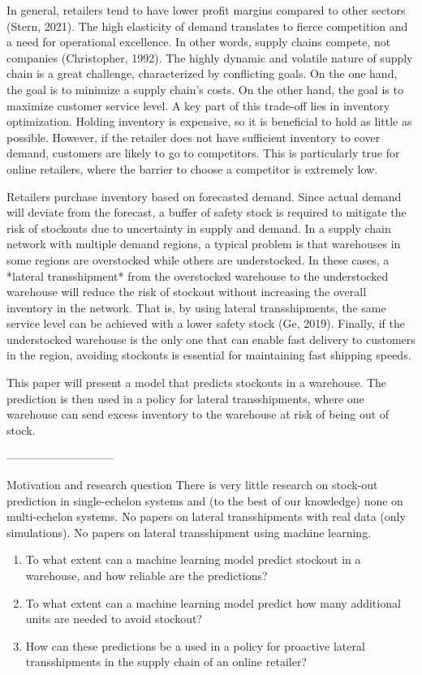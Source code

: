 \documentclass[../../main.tex]{subfiles}
\begin{document}
In general, retailers tend to have lower profit margins compared to other sectors (Stern, 2021). The high elasticity of demand translates to fierce competition and a need for operational excellence. In other words, supply chains compete, not companies (Christopher, 1992). The highly dynamic and volatile nature of supply chain is a great challenge, characterized by conflicting goals. On the one hand, the goal is to minimize a supply chain's costs. On the other hand, the goal is to maximize customer service level. A key part of this trade-off lies in inventory optimization. Holding inventory is expensive, so it is beneficial to hold as little as possible. However, if the retailer does not have sufficient inventory to cover demand, customers are likely to go to competitors. This is particularly true for online retailers, where the barrier to choose a competitor is extremely low. 

Retailers purchase inventory based on forecasted demand. Since actual demand will deviate from the forecast, a buffer of safety stock is required to mitigate the risk of stockouts due to uncertainty in supply and demand. In a supply chain network with multiple demand regions, a typical problem is that warehouses in some regions are overstocked while others are understocked. In these cases, a *lateral transshipment* from the overstocked warehouse to the understocked warehouse will reduce the risk of stockout without increasing the overall inventory in the network. That is, by using lateral transshipments, the same service level can be achieved with a lower safety stock  (Ge, 2019). Finally, if the understocked warehouse is the only one that can enable fast delivery to customers in the region, avoiding stockouts is essential for maintaining fast shipping speeds.

This paper will present a model that predicts stockouts in a warehouse. The prediction is then used in a policy for lateral transshipments, where one warehouse can send excess inventory to the warehouse at risk of being out of stock.

-----------------------------

Motivation and research question
There is very little research on stock-out prediction in single-echelon systems and (to the best of our knowledge) none on multi-echelon systems. No papers on lateral transshipments with real data (only simulations). No papers on lateral transshipment using machine learning.

\begin{enumerate}
\item To what extent can a machine learning model predict stockout in a warehouse, and how reliable are the predictions?
\item To what extent can a machine learning model predict how many additional units are needed to avoid stockout?
\item How can these predictions be a used in a policy for proactive lateral transshipments in the supply chain of an online retailer?
\end{enumerate}
\end{document}
